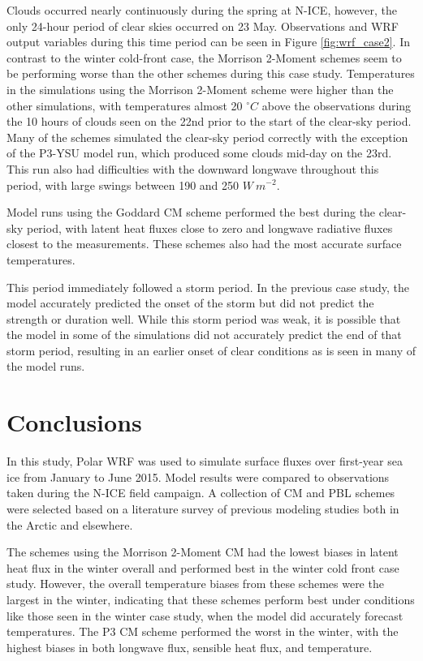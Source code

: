 Clouds occurred nearly continuously during the spring at N-ICE, however, the only 24-hour period of clear skies occurred on 23 May. Observations and WRF output variables during this time period can be seen in Figure \ref{fig:wrf_case2}. In contrast to the winter cold-front case, the Morrison 2-Moment schemes seem to be performing worse than the other schemes during this case study. Temperatures in the simulations using the Morrison 2-Moment scheme were higher than the other simulations, with temperatures almost 20 $^{\circ} C$ above the observations during the 10 hours of clouds seen on the 22nd prior to the start of the clear-sky period. Many of the schemes simulated the clear-sky period correctly with the exception of the P3-YSU model run, which produced some clouds mid-day on the 23rd. This run also had difficulties with the downward longwave throughout this period, with large swings between 190 and 250 $W~m^{-2}$. 

Model runs using the Goddard CM scheme performed the best during the clear-sky period, with latent heat fluxes close to zero and longwave radiative fluxes closest to the measurements. These schemes also had the most accurate surface temperatures.

This period immediately followed a storm period. In the previous case study, the model accurately predicted the onset of the storm but did not predict the strength or duration well. While this storm period was weak, it is possible that the model in some of the simulations did not accurately predict the end of that storm period, resulting in an earlier onset of clear conditions as is seen in many of the model runs.

\section{Conclusions}
In this study, Polar WRF was used to simulate surface fluxes over first-year sea ice from January to June 2015. Model results were compared to observations taken during the N-ICE field campaign. A collection of CM and PBL schemes were selected based on a literature survey of previous modeling studies both in the Arctic and elsewhere. 

The schemes using the Morrison 2-Moment CM had the lowest biases in latent heat flux in the winter overall and performed best in the winter cold front case study. However, the overall temperature biases from these schemes were the largest in the winter, indicating that these schemes perform best under conditions like those seen in the winter case study, when the model did accurately forecast temperatures. The P3 CM scheme performed the worst in the winter, with the highest biases in both longwave flux, sensible heat flux, and temperature. 

